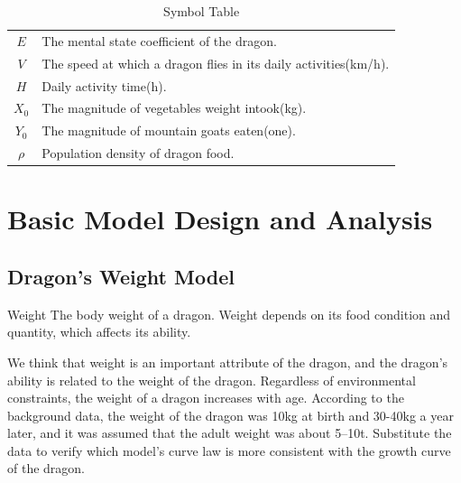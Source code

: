 \begin{table}[t]
\begin{tabularx}{\textwidth}{cX}
    \rowcolor[HTML]{EFEFEF} $E$     & The mental state coefficient of the dragon. \\
                            $V$     & The speed at which a dragon flies in its daily activities(km/h). \\
    \rowcolor[HTML]{EFEFEF} $H$     & Daily activity time(h). \\
                            $X_0$   & The magnitude of vegetables weight intook(kg). \\
    \rowcolor[HTML]{EFEFEF} $Y_0$   & The magnitude of mountain goats eaten(one). \\
                            $\rho$  & Population density of dragon food. \\
    \bottomrule
    \end{tabularx}
    \caption{Symbol Table}\label{tab:demo}
    \end{table}

\section{Basic Model Design and Analysis}

\subsection{Dragon's Weight Model}


\begin{defn}{Weight}
  The body weight of a dragon. Weight depends on its food condition and quantity, which affects its ability.
\end{defn}

We think that weight is an important attribute of the dragon, and the dragon's ability is related to the weight of the dragon. Regardless of environmental constraints, the weight of a dragon increases with age. According to the background data, the weight of the dragon was 10kg at birth and 30-40kg a year later, and it was assumed that the adult weight was about 5--10t. Substitute the data to verify which model's curve law is more consistent with the growth curve of the dragon.

